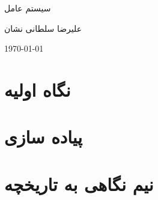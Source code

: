 \documentclass[20pt, a4paper]{article}
\begin{document}
\centerline{سیستم عامل }
\centerline{علیرضا سلطانی نشان}
\centerline{\today}
\tableofcontents

\section{نگاه اولیه}

\section{پیاده سازی}

\section{نیم نگاهی به تاریخچه}
\end{document}
